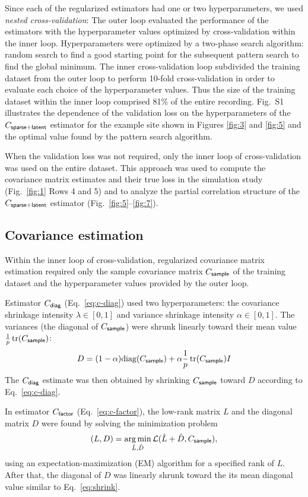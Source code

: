 Since each of the regularized estimators had one or two hyperparameters, we used \emph{nested cross-validation}:  The outer loop evaluated the performance of the estimators with the hyperparameter values optimized by cross-validation within the inner loop.  Hyperparameters were optimized by a two-phase search algorithm: random search to find a good starting point for the subsequent pattern search to find the global minimum.  The inner cross-validation loop subdivided the training dataset from the outer loop to perform 10-fold cross-validation in order to evaluate each choice of the hyperparameter values.  Thus the size of the training dataset within the inner loop comprised 81\% of the entire recording. Fig.~S1 illustrates the dependence of the validation loss on the hyperparameters of the $C_{\sf sparse+latent}$ estimator for the example site shown in Figures \ref{fig:3} and \ref{fig:5} and the optimal value found by the pattern search algorithm.

When the validation loss was not required, only the inner loop of cross-validation was used on the entire dataset.  This approach was used to compute the covariance matrix estimates and their true loss in the simulation study (Fig.~\ref{fig:1} Rows 4 and 5) and to analyze the partial correlation structure of the $C_{\sf sparse+latent}$ estimator (Fig.~\ref{fig:5}--\ref{fig:7}).

\subsection*{Covariance estimation}
Within the inner loop of cross-validation, regularized covariance matrix estimation required only the sample covariance matrix $C_{\sf sample}$ of the training dataset and the hyperparameter values provided by the outer loop.

Estimator $C_{\sf diag}$ (Eq.~\ref{eq:c-diag})  used two hyperparameters: the covariance shrinkage intensity $\lambda \in [0,1]$ and variance shrinkage intensity $\alpha \in [0,1]$.  The variances (the diagonal of $C_{\sf sample}$) were shrunk linearly toward their mean value $\frac 1 p \operatorname{tr}(C_{\sf sample})$:
\begin{equation}\label{eq:shrink}
D = (1-\alpha)\mbox{diag}(C_{\sf sample}) + \alpha \frac 1 p \operatorname{tr}(C_{\sf sample}) I
\end{equation}
The $C_{\sf diag}$ estimate was then obtained by shrinking $C_{\sf sample}$ toward $D$ according to Eq.~\ref{eq:c-diag}.

In estimator $C_{\sf factor}$ (Eq.~\ref{eq:c-factor}), the low-rank matrix $L$ and the diagonal matrix $D$ were found by solving the minimization problem
\begin{equation}
(L,D) = \operatorname*{arg\,min}\limits_{\hat L,\hat D} \mathcal L(\hat L + \hat D,C_{\sf sample}),
\end{equation}
using an expectation-maximization (EM) algorithm for a specified rank of $L$. After that, the diagonal of $D$ was linearly shrunk toward the its mean diagonal value similar to Eq.~\ref{eq:shrink}.

